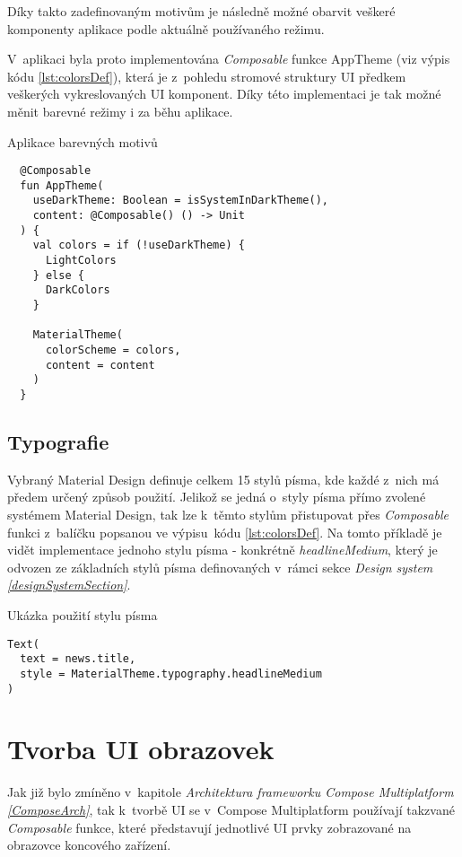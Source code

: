 Díky takto zadefinovaným motivům je následně možné obarvit veškeré komponenty aplikace podle aktuálně používaného režimu.

V~aplikaci byla proto implementována \textit{Composable} funkce AppTheme (viz výpis kódu \ref{lst:colorsDef}), která je z~pohledu stromové struktury
UI předkem veškerých vykreslovaných UI komponent. Díky této implementaci je tak možné měnit barevné režimy i za běhu aplikace. 
\begin{listing}[H]
\caption{Aplikace barevných motivů}\label{lst:colorsDef}
\begin{verbatim}
  @Composable
  fun AppTheme(
    useDarkTheme: Boolean = isSystemInDarkTheme(),
    content: @Composable() () -> Unit
  ) {
    val colors = if (!useDarkTheme) {
      LightColors
    } else {
      DarkColors
    }
  
    MaterialTheme(
      colorScheme = colors,
      content = content
    )
  }
\end{verbatim}
\end{listing}


\subsection*{Typografie}
Vybraný Material Design definuje celkem 15 stylů písma, kde každé z~nich má předem určený způsob použití. \cite{material3} 
Jelikož se jedná o~styly písma přímo zvolené systémem Material Design, tak lze k~těmto stylům přistupovat přes
\textit{Composable} funkci  z~balíčku  popsanou ve výpisu~kódu \ref{lst:colorsDef}.
Na tomto příkladě je vidět implementace jednoho stylu písma - konkrétně \textit{headlineMedium}, který je odvozen ze základních stylů písma 
definovaných v~rámci sekce \textit{Design system \ref{designSystemSection}}.

\begin{listing}[H]
\caption{Ukázka použití stylu písma}\label{lst:typographyExample}
\begin{verbatim}
Text(
  text = news.title,
  style = MaterialTheme.typography.headlineMedium
)
\end{verbatim}
\end{listing}

\section{Tvorba UI obrazovek}
Jak již bylo zmíněno v~kapitole \textit{Architektura frameworku Compose Multiplatform \ref{ComposeArch}}, tak k~tvorbě UI se v~Compose Multiplatform 
používají takzvané \textit{Composable} funkce, které představují jednotlivé UI prvky zobrazované na obrazovce koncového zařízení. 


